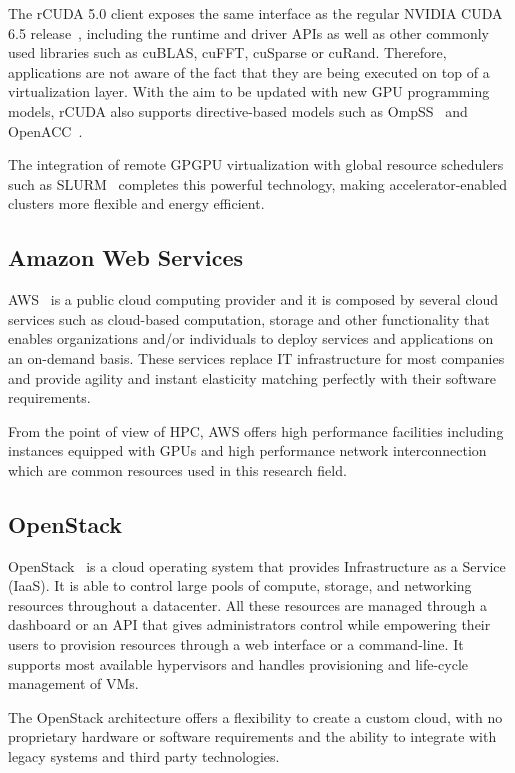 \documentclass[a4paper,twoside]{article}
\begin{document}
The {rCUDA} 5.0 client exposes the same interface as the regular NVIDIA
CUDA 6.5 release~\cite{cuda65}, including the runtime and driver
APIs as well as other commonly used libraries such as cuBLAS, cuFFT, cuSparse or cuRand.
Therefore, applications are not aware of the fact that they are being executed
on top of a virtualization layer.
With the aim to be updated with new GPU programming models, {rCUDA} also supports
directive-based models such as OmpSS~\cite{repara15} and OpenACC~\cite{cluster15}.

The integration of remote GPGPU virtualization with global
resource schedulers such as SLURM~\cite{sbacpad14} completes this powerful
technology, making accelerator-enabled clusters more flexible and
energy efficient.

\subsection{Amazon Web Services}
\label{sec:aws}
AWS~\cite{aws} is a public cloud computing provider
and it is composed by several cloud services such as 
 cloud-based computation, storage and other functionality 
that enables organizations and/or individuals to deploy
services and applications on an on-demand basis. 
These services replace IT infrastructure for most companies and provide agility and instant elasticity matching 
perfectly with their software requirements.

From the point of view of HPC, AWS offers high performance facilities including 
instances equipped with GPUs and high performance network interconnection which 
are common resources used in this research field.

\subsection{OpenStack}
\label{sec:openstack}

OpenStack~\cite{OpenStack} is a cloud operating system that provides Infrastructure as a Service (IaaS). 
It is able to control large pools of compute, storage, and networking resources throughout a 
datacenter. All these resources are managed through a dashboard or an API that gives administrators 
control while empowering their users to provision resources through a web interface
or a command-line. 
It supports most available hypervisors and handles provisioning 
and life-cycle management of VMs.
 
The OpenStack architecture offers a flexibility to create a custom cloud, with no proprietary hardware
or software requirements and the ability to integrate with legacy systems and third party technologies. 
\end{document}
